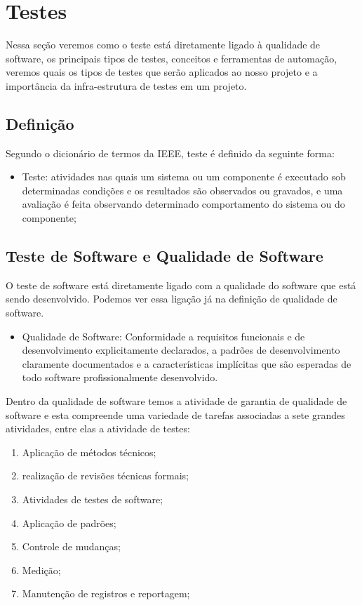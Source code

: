 \section{Testes}

Nessa seção veremos como o teste está diretamente ligado à qualidade de software, os principais tipos de testes, conceitos e ferramentas de automação, veremos quais os tipos de testes que serão aplicados ao nosso projeto e a importância da infra-estrutura de testes em um projeto.


\subsection{Definição}

Segundo o dicionário de termos da IEEE, teste é definido da seguinte forma:

\begin{itemize}
	\item Teste: atividades nas quais um sistema ou um componente é executado sob determinadas condições e os resultados são observados ou gravados, e uma avaliação é feita observando determinado comportamento do sistema ou do componente;
\end{itemize}

\subsection{Teste de Software e Qualidade de Software}

O teste de software está diretamente ligado com a qualidade do software que está sendo desenvolvido. Podemos ver essa ligação já na definição de qualidade de software.

\begin{itemize}
	\item Qualidade de Software: Conformidade a requisitos funcionais e de desenvolvimento explicitamente declarados, a padrões de desenvolvimento claramente documentados e a características implícitas que são esperadas de todo software profissionalmente desenvolvido.
\end {itemize}

Dentro da qualidade de software temos a atividade de garantia de qualidade de software e esta compreende uma variedade de tarefas associadas a sete grandes atividades, entre elas a atividade de testes:

\begin{enumerate}
	\item Aplicação de métodos técnicos;
	\item realização de revisões técnicas formais;
	\item Atividades de testes de software;
	\item Aplicação de padrões;
	\item Controle de mudanças;
	\item Medição;
	\item Manutenção de registros e reportagem;
\end{enumerate}

